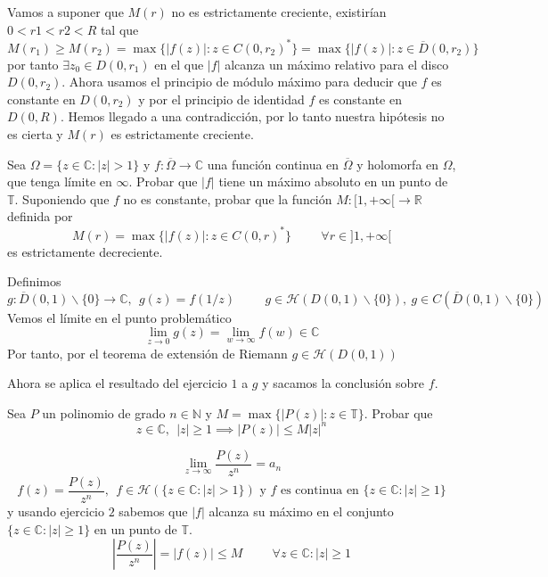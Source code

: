 \begin{sol}
	Vamos a suponer que $M(r)$ no es estrictamente creciente, existirían $0<r1<r2<R$ tal que
	$$M(r_1) \geq M(r_2) = \max\{ |f(z)| : z\in C(0,r_2)^{\ast} \} = \max\{ |f(z)| : z\in\overline{D}(0,r_2) \}$$
	por tanto
	$\exists z_0 \in D(0,r_1)$ en el que $|f|$ alcanza un máximo relativo para el disco $D(0,r_2)$.
	Ahora usamos el principio de módulo máximo para deducir que 
	$f$ es constante en $D(0,r_2)$ y por el principio de identidad
	$f$ es constante en $D(0,R)$. 
	Hemos llegado a una contradicción, por lo tanto nuestra hipótesis no es cierta y $M(r)$ es estrictamente creciente.
	
\end{sol}

\begin{ejer}
	Sea $\Omega = \{ z\in\mathbb{C} : |z|>1 \}$ y $f:\overline{\Omega}\rightarrow\mathbb{C}$ una función continua en $\overline{\Omega}$ y holomorfa en $\Omega$, que tenga límite en $\infty$. 
	Probar que $|f|$ tiene un máximo absoluto en un punto de $\mathbb{T}$.
	Suponiendo que $f$ no es constante, probar que la función $M:[1,+\infty[\rightarrow\mathbb{R}$ definida por
	$$ M(r) = \max\{ |f(z)| : z\in C(0,r)^{\ast} \}  \hspace{1cm} \forall r\in ]1,+\infty[$$
	es estrictamente decreciente.
\end{ejer}
\begin{sol}
	Definimos
	$$g:\overline{D}(0,1)\backslash\{0\} \rightarrow \mathbb{C}, \ \ g(z) = f(1/z) \hspace{1cm} g\in\mathcal{H}(D(0,1)\backslash\{0\}), \
	g\in C(\overline{D}(0,1)\backslash\{0\})$$
	Vemos el límite en el punto problemático
	$$\lim_{z\rightarrow0} g(z) = \lim_{w\rightarrow\infty} f(w) \in\mathbb{C}$$
	Por tanto, por el teorema de extensión de Riemann
	$g\in\mathcal{H}(D(0,1))$
	
	Ahora se aplica el resultado del ejercicio $1$ a $g$ y sacamos la conclusión sobre $f$.
\end{sol}


\begin{ejer}
	Sea $P$ un polinomio de grado $n\in\mathbb{N}$ y $M = \max\{ |P(z)| : z\in\mathbb{T} \}$. Probar que
	$$ z\in\mathbb{C},\ \ |z|\geq 1 \implies |P(z)| \leq M|z|^n $$
\end{ejer}
\begin{sol}
	$$\lim_{z\rightarrow\infty} \frac{P(z)}{z^n} = a_n$$
	$$f(z) = \frac{P(z)}{z^n}, \ \ f\in\mathcal{H}(\{ z\in\mathbb{C} : |z|>1 \}) \text{ y $f$ es continua en }\{ z\in\mathbb{C} : |z|\geq 1 \}$$
	y usando ejercicio $2$ sabemos que
	$|f|$ alcanza su máximo en el conjunto $\{ z\in\mathbb{C} : |z|\geq 1 \}$ en un punto de $\mathbb{T}$.
	$$\left| \frac{P(z)}{z^n} \right| = |f(z)| \leq M \hspace{1cm} \forall z\in\mathbb{C} : |z|\geq 1$$
\end{sol}


